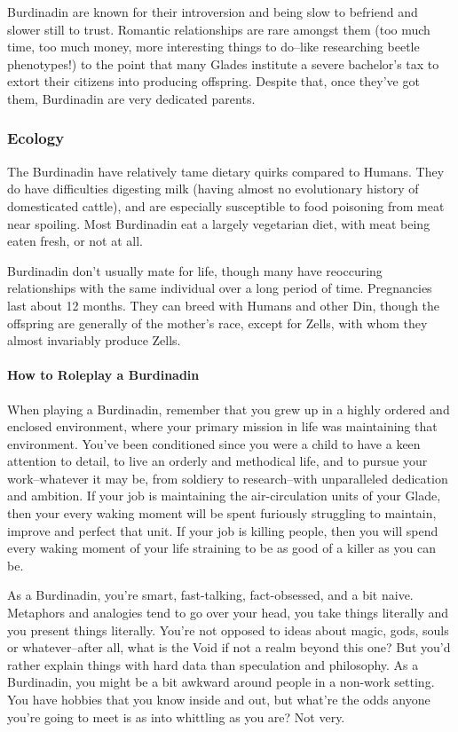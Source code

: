 \documentclass[oneside,11pt,english]{book}
\begin{document}
Burdinadin are known for their introversion and being slow to befriend and slower still to trust. Romantic 
relationships are rare amongst them (too much time, too much money, more interesting things to do--like 
researching beetle phenotypes!) to the point that many Glades institute a severe bachelor’s tax to extort 
their citizens into producing offspring. Despite that, once they’ve got them, Burdinadin are very dedicated 
parents. 

\subsubsection*{Ecology} 
The Burdinadin have relatively tame dietary quirks compared to Humans. They do have difficulties 
digesting milk (having almost no evolutionary history of domesticated cattle), and are especially 
susceptible to food poisoning from meat near spoiling. Most Burdinadin eat a largely vegetarian diet, with 
meat being eaten fresh, or not at all. 

Burdinadin don’t usually mate for life, though many have reoccuring relationships with the same individual over a long period of time. Pregnancies last about 12 months. They can breed with Humans and other Din, though the offspring are generally of the mother's race, except for Zells, with whom they almost invariably produce Zells. 
\paragraph{How to Roleplay a Burdinadin}
When playing a Burdinadin, remember that you grew up in a highly ordered and enclosed environment, where your primary mission in life was maintaining that environment. You’ve been conditioned since you 
were a child to have a keen attention to detail, to live an orderly and methodical life, and to pursue your work--whatever it may be, from soldiery to research--with unparalleled dedication and ambition. If your job is maintaining the air-circulation units of your Glade, then your every waking moment will be spent furiously struggling to maintain, improve and perfect that unit. If your job is killing people, then you will spend every waking moment of your life straining to be as good of a killer as you can be. 

As a Burdinadin, you’re smart, fast-talking, fact-obsessed, and a bit naive. Metaphors and analogies tend to go over your head, you take things literally and you present things literally. You’re not opposed to ideas about magic, gods, souls or whatever--after all, what is the Void if not a realm beyond this one? But you’d rather explain things with hard data than speculation and philosophy. As a Burdinadin, you might be a bit awkward around people in a non-work setting. You have hobbies that you know inside and out, but what’re the odds anyone you’re going to meet is as into whittling as you are? Not very. 
\end{document}
